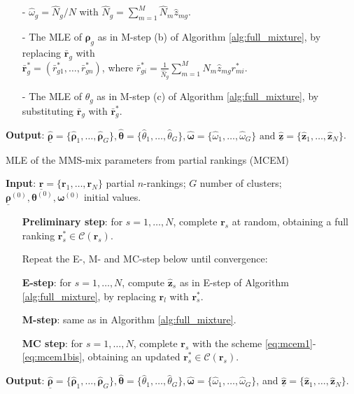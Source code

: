 \begin{algorithm}[h!]
\begin{enumerate}
    \begin{itemize}
        \item[-] $\hat\omega_g =\hat{N}_g/N$ with $\hat{N}_g=\sum_{m=1}^M\hat{N}_m\hat z_{mg}$.
        \item[-] The MLE of $\bm\rho_g$ as in M-step (b) of Algorithm \ref{alg:full_mixture},  by replacing $\bar{\bm r}_g$ with\\
        $\bar{\bm r}^*_g = (\bar r^*_{g1},\dots, \bar r^*_{gn})$, where $\bar r^*_{gi} = \frac{1}{\hat N_g}\sum_{m=1}^M \hat N_m \hat z_{mg}r^*_{mi}$.
        \item[-] The MLE of $\theta_g$ as in M-step (c) of Algorithm \ref{alg:full_mixture}, by substituting $\bar{\bm r}_g$ with $\bar{\bm r}^*_g$.
    \end{itemize}
\end{enumerate}
   \hspace*{\algorithmicindent} \textbf{Output}: $\underline{\hat{\bm{\rho}}}=\{\hat{\bm{\rho}}_1,\dots,\hat{\bm{\rho}}_G\},{\hat{\bm\theta}}=\{\hat{\theta}_1,\dots,\hat{\theta}_G\},{\hat{\bm\omega}}=\{\hat\omega_1,\dots,\hat\omega_G\}\text{ and }\underline{\hat{\bm z}}=\{\bm \hat z_1,\dots,\bm \hat z_N\}$.
\end{algorithm}


\begin{algorithm}[h!]\small
\caption{MLE of the MMS-mix parameters from partial rankings (MCEM)}
\label{alg:partial_mcem}
\hspace*{\algorithmicindent} \textbf{Input}: $\underline{\bm{r}}=\{\bm{r}_1,\dots,\bm{r}_N\}$ partial $n$-rankings; $G$ number of clusters; $\underline{\bm{\rho}}^{(0)}, \bm{\theta}^{(0)}, \bm{\omega}^{(0)}$ initial values.


\begin{enumerate}
\item[] \textbf{Preliminary step}: for $s=1,\dots,N$, complete $\bm{r}_s$ at random, obtaining a full ranking $\bm{r}^*_s\in \mathcal{C}(\bm r_s)$.
    \item[] Repeat the E-, M- and MC-step below until convergence:
    \item[] \textbf{E-step}: for $s=1,\dots,N$,  compute $\hat{\bm z}_s$ as in E-step of Algorithm \ref{alg:full_mixture}, by replacing $\bm r_l$ with $\bm r^*_s$.

 \item[] \textbf{M-step}: same as in Algorithm \ref{alg:full_mixture}.

 \item[] \textbf{MC step}: for $s=1,\dots,N$, complete $\bm{r}_s$  with the scheme \eqref{eq:mcem1}-\eqref{eq:mcem1bis}, obtaining an updated $\bm{r}^*_s\in\mathcal{C}(\bm r_s)$.
\end{enumerate}
   \hspace*{\algorithmicindent} \textbf{Output}: $\underline{\hat{\bm{\rho}}}=\{\hat{\bm{\rho}}_1,\dots,\hat{\bm{\rho}}_G\},{\hat{\bm\theta}}=\{\hat{\theta}_1,\dots,\hat{\theta}_G\},{\hat{\bm\omega}}=\{\hat\omega_1,\dots,\hat\omega_G\}$, and $\underline{\hat{\bm z}}=\{\bm \hat z_1,\dots,\bm \hat z_N\}$.
\end{algorithm}

